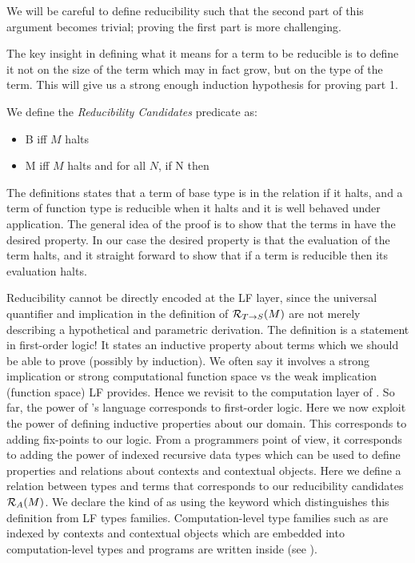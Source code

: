 We will be careful to define reducibility such that the second part of
this argument becomes trivial; proving the first part is more
challenging. 

The key insight in defining what it means for a term to be reducible
is to define it not on the size of the term which may in fact grow,
but on the type of the term. This will give us a strong enough
induction hypothesis for proving part 1. 

We define the \emph{Reducibility Candidates} predicate as:

\begin{itemize}
\item \rc \iota B iff $M$ halts
\item {} M iff $M$ halts and for all $N$, if  N then 
\end{itemize}

The definitions states that a term of base type is in the relation if
it halts, and a term of function type is reducible when it halts and it is well
behaved under application. The general idea of the proof is to show
that the terms in  have the desired property. In our case the desired
property is that the evaluation of the term halts, and it straight
forward to show that if a term is reducible then its evaluation halts.

Reducibility cannot be directly encoded at the LF layer, since the
universal quantifier and implication in the definition of $\mathcal{R}_{T
  \rightarrow S}(M)$ are not merely describing a hypothetical and parametric
derivation. The definition is a statement in first-order logic! It
states an inductive property about terms which we should be able to prove
(possibly by induction). We often say it involves a strong implication
or strong computational function space vs the weak implication
(function space) LF provides. Hence we revisit to the
computation layer of \beluga. So far, the power of \beluga's language
corresponds to first-order logic. Here we now exploit the power of
defining inductive properties about our domain. This corresponds to
adding fix-points to our logic. From a programmers point of view, it
corresponds to adding the power of indexed recursive data types which
can be used to define properties and relations about contexts and
contextual objects. Here we define a relation  between
types  and terms  that corresponds to our reducibility
candidates $\mathcal{R}_{A}(M)$. We declare the kind of  as using the
keyword  which distinguishes this definition from LF types
families. Computation-level type families such as  are
indexed by contexts and contextual objects which are embedded into
computation-level types and programs are written inside \bel{[ ]} (see
\cite{Cave:POPL12}). 



